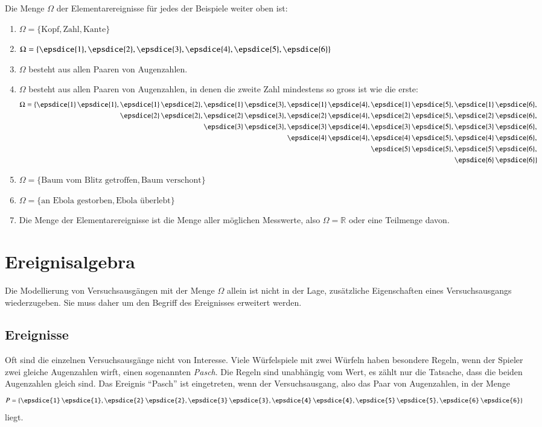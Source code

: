 Die Menge $\Omega$ der Elementarereignisse für jedes der Beispiele weiter
oben ist:
\begin{enumerate}
\item $\Omega=\{\text{Kopf},\text{Zahl},\text{Kante}\}$
\item $\Omega=\{\epsdice{1},
\epsdice{2},
\epsdice{3},
\epsdice{4},
\epsdice{5},
\epsdice{6}\}$
\item $\Omega$ besteht aus allen Paaren von Augenzahlen.
\item $\Omega$ besteht aus allen Paaren von Augenzahlen, in denen die
zweite Zahl mindestens so gross ist wie die erste:
{
\def\e#1#2{\epsdice{#1}\,\epsdice{#2}}
\def\p{\phantom{\epsdice{1}\,\epsdice{1},\,}}
\begin{align*}
\Omega=\{
           &\e{1}{1},\e{1}{2},\e{1}{3},\e{1}{4},\e{1}{5},\e{1}{6},\\
           &\p       \e{2}{2},\e{2}{3},\e{2}{4},\e{2}{5},\e{2}{6},\\
           &\p       \p       \e{3}{3},\e{3}{4},\e{3}{5},\e{3}{6},\\
           &\p       \p       \p       \e{4}{4},\e{4}{5},\e{4}{6},\\
           &\p       \p       \p       \p       \e{5}{5},\e{5}{6},\\
           &\p       \p       \p       \p       \p       \e{6}{6}
\}
\end{align*}
}
\item $\Omega=\{\text{Baum vom Blitz getroffen},\text{Baum verschont}\}$
\item $\Omega=\{\text{an Ebola gestorben},\text{Ebola überlebt}\}$
\item Die Menge der Elementarereignisse ist die Menge aller möglichen
Messwerte, also $\Omega=\mathbb{R}$ oder eine Teilmenge davon.
\end{enumerate}

\section{Ereignisalgebra} \label{section-ereignisse}
Die Modellierung von Versuchsausgängen mit der Menge $\Omega$
allein ist nicht in der Lage, zusätzliche Eigenschaften eines
Versuchsausgangs wiederzugeben.
Sie muss daher um den Begriff des Ereignisses erweitert werden.

\subsection{Ereignisse}
Oft sind die einzelnen Versuchsausgänge nicht von Interesse.
Viele Würfelspiele mit zwei Würfeln haben besondere Regeln, wenn
der Spieler zwei gleiche Augenzahlen wirft, einen sogenannten {\em Pasch}.
Die Regeln sind unabhängig vom Wert, es zählt nur die Tatsache,
dass die beiden Augenzahlen gleich sind.
Das Ereignis ``Pasch'' ist eingetreten, wenn der Versuchsausgang, also das
Paar von Augenzahlen, in der Menge
\[
\def\e#1{\epsdice{#1}\,\epsdice{#1}}
P=\{
\e{1},
\e{2},
\e{3},
\e{4},
\e{5},
\e{6}
\}
\]
liegt.

